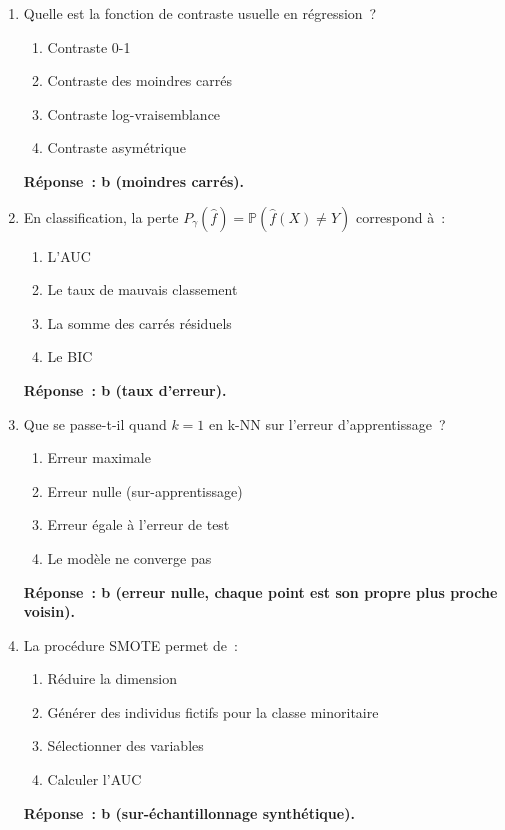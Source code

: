 \documentclass[a4paper,11pt]{article}
\theoremstyle{definition}
\theoremstyle{remark}
\begin{document}
\begin{enumerate}

  \item Quelle est la fonction de contraste usuelle en r\'egression~?
    \begin{enumerate}
      \item Contraste 0-1
      \item Contraste des moindres carr\'es
      \item Contraste log-vraisemblance
      \item Contraste asym\'etrique
    \end{enumerate}
    \textbf{R\'eponse~: b (moindres carr\'es).}

  \item En classification, la perte $P_\gamma(\hat{f}) =
    \mathbb{P}(\hat{f}(X) \neq Y)$ correspond \`a~:
    \begin{enumerate}
      \item L'AUC
      \item Le taux de mauvais classement
      \item La somme des carr\'es r\'esiduels
      \item Le BIC
    \end{enumerate}
    \textbf{R\'eponse~: b (taux d'erreur).}

  \item Que se passe-t-il quand $k=1$ en k-NN sur l'erreur
    d'apprentissage~?
    \begin{enumerate}
      \item Erreur maximale
      \item Erreur nulle (sur-apprentissage)
      \item Erreur \'egale \`a l'erreur de test
      \item Le mod\`ele ne converge pas
    \end{enumerate}
    \textbf{R\'eponse~: b (erreur nulle, chaque point est son propre
    plus proche voisin).}

  \item La proc\'edure SMOTE permet de~:
    \begin{enumerate}
      \item R\'eduire la dimension
      \item G\'en\'erer des individus fictifs pour la classe
        minoritaire
      \item S\'electionner des variables
      \item Calculer l'AUC
    \end{enumerate}
    \textbf{R\'eponse~: b (sur-\'echantillonnage synth\'etique).}


\end{enumerate}
\end{document}
